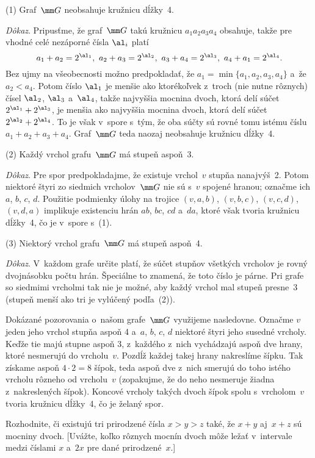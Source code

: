{\medskip
\ite(1) Graf~$\mm G$ neobsahuje kružnicu dĺžky~4.

{\it Dôkaz}.
Pripusťme, že graf~$\mm G$ takú kružnicu $a_1a_2a_3a_4$ obsahuje,
takže pre vhodné celé nezáporné čísla $\al_i$ platí
$$
a_1+a_2=2^{\al_1},\
a_2+a_3=2^{\al_2},\
a_3+a_4=2^{\al_3},\
a_4+a_1=2^{\al_4}.
$$
Bez ujmy na všeobecnosti možno predpokladať, že
$a_1=\min\{a_1,a_2,a_3,a_4\}$ a~že $a_2<a_4$. Potom číslo
$\al_1$ je menšie ako ktorékoľvek z~troch (nie nutne rôznych) čísel
$\al_2$, $\al_3$ a~$\al_4$,
takže najvyššia mocnina dvoch, ktorá delí súčet
$2^{\al_1}+2^{\al_3}$, je menšia ako najvyššia mocnina dvoch,
ktorá delí súčet $2^{\al_2}+2^{\al_4}$.
To je však v~spore s~tým, že oba súčty sú rovné tomu istému číslu
$a_1+a_2+a_3+a_4$.
Graf~$\mm G$ teda naozaj neobsahuje kružnicu dĺžky~4.

\ite(2) Každý vrchol grafu~$\mm G$ má stupeň aspoň~3.

{\it Dôkaz}. Pre spor predpokladajme, že existuje vrchol~$v$
stupňa nanajvýš~2. Potom niektoré štyri zo siedmich vrcholov~$\mm G$ nie sú
s~$v$ spojené hranou; označme ich $a$, $b$, $c$, $d$.
Použitie podmienky úlohy na trojice $(v,a,b)$, $(v,b,c)$, $(v,c,d)$, $(v,d,a)$
implikuje existenciu hrán $ab$, $bc$, $cd$ a~$da$, ktoré
však tvoria kružnicu dĺžky~4, čo je v~spore s~(1).

\ite(3) Niektorý vrchol grafu~$\mm G$ má stupeň aspoň~4.

{\it Dôkaz}. V~každom grafe určite platí, že
súčet stupňov všetkých vrcholov je rovný dvojnásobku počtu hrán.
Špeciálne to znamená, že toto číslo je párne. Pri grafe so siedmimi vrcholmi
tak nie je možné, aby každý vrchol mal stupeň
presne~3 (stupeň menší ako tri je vylúčený podľa~(2)).

\medskip
Dokázané pozorovania o~našom grafe~$\mm G$ využijeme nasledovne.
Označme $v$ jeden jeho vrchol stupňa aspoň 4 a~$a$, $b$, $c$, $d$
niektoré štyri jeho susedné vrcholy. Keďže tie
majú stupne aspoň 3, z~každého z~nich vychádzajú aspoň dve hrany,
ktoré nesmerujú do vrcholu~$v$.
Pozdĺž každej takej hrany nakreslíme šípku. Tak získame
aspoň $4\cdot 2=8$ šípok, teda aspoň dve z~nich smerujú
do toho istého vrcholu rôzneho od vrcholu~$v$ (zopakujme, že do neho
nesmeruje žiadna z~nakreslených šípok). Koncové vrcholy takých
dvoch šípok spolu s~vrcholom~$v$ tvoria kružnicu dĺžky~4,
čo je želaný spor.

\návody
Rozhodnite, či existujú tri prirodzené čísla $x>y>z$
také, že $x+y$ aj~$x+z$ sú mocniny dvoch.
[Uvážte, koľko rôznych mocnín dvoch môže ležať v~intervale medzi
číslami $x$ a~$2x$ pre dané prirodzené~$x$.]

}
